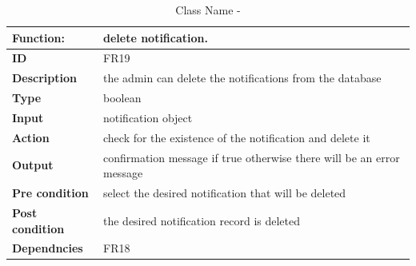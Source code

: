 \documentclass[]{article}
\begin{document}
\FloatBarrier
\begin{table}[h]
\caption{Class Name - }
\label{tab:my-table}
\begin{tabular}{|p{}|p{}|}
\hline
\textbf{Function:} & delete notification.
\\ \hline
\textbf{ID}  & FR19

\\ \hline
\textbf{Description}    & the admin can delete the notifications from the database                                                                     
\\ \hline
\textbf{Type}    &  boolean       

\\ \hline
\textbf{Input}        & notification object


\\ \hline
\textbf{Action}            & check for the existence of the notification and delete it 

\\ \hline
\textbf{Output}            & confirmation message if true otherwise there will be an error message 

\\ \hline
\textbf{Pre condition}           & select the desired notification that will be deleted  

\\ \hline
\textbf{Post condition}           & the desired notification record is deleted


\\ \hline
\textbf{Dependncies}           & FR18
\\ \hline
\end{tabular}
\end{table}
\end{document}
